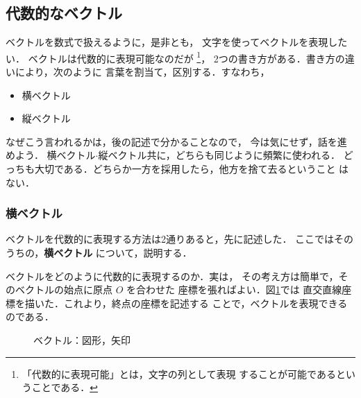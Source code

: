             \subsection{代数的なベクトル}
            \begin{mycomment}
                ベクトルを数式で扱えるように，是非とも，
                文字を使ってベクトルを表現したい．
                ベクトルは代数的に表現可能なのだが
                    \footnote{
                        「代数的に表現可能」とは，文字の列として表現
                        することが可能であるということである．
                    }，
                2つの書き方がある．書き方の違いにより，次のように
                言葉を割当て，区別する．すなわち，
                    \begin{itemize}
                        \item 横ベクトル
                        \item 縦ベクトル
                    \end{itemize}
                なぜこう言われるかは，後の記述で分かることなので，
                今は気にせず，話を進めよう．
                横ベクトル$\cdot$縦ベクトル共に，どちらも同じように頻繁に使われる．
                どっちも大切である．どちらか一方を採用したら，他方を捨て去るということ
                はない．
            \end{mycomment}

                \subsubsection{横ベクトル}
                ベクトルを代数的に表現する方法は2通りあると，先に記述した．
                ここではそのうちの，\textbf{横ベクトル} について，説明する．

                ベクトルをどのように代数的に表現するのか．実は，
                その考え方は簡単で，そのベクトルの始点に原点 $O$ を合わせた
                座標を張ればよい．図\ref{fig:yajirusi_vector_daisu}では
                直交直線座標を描いた．これより，終点の座標を記述する
                ことで，ベクトルを表現できるのである．
                        \begin{figure}[hbt]
                            \begin{center}
                                \caption{ベクトル：図形，矢印}
                                \label{fig:yajirusi_vector_daisu}
                            \end{center}
                        \end{figure}

